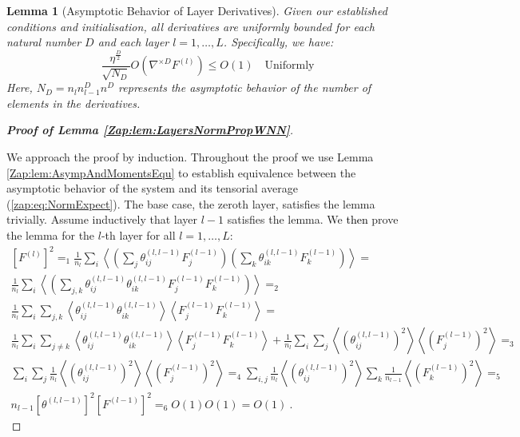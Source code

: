 \documentclass{article} %
\newtheorem{lemma}[theorem]{Lemma}
\begin{document}
\begin{lemma}[Asymptotic Behavior of Layer Derivatives]
\label{Zap:lem:LayersDerAsyBehvaior}
\textup
{Given our established conditions and initialisation, all derivatives are uniformly bounded for each natural number \(D\) and each layer \(l=1,\ldots,L\). Specifically, we have:
\begin{equation}
\frac{\eta^{\frac{D}{2}}}{\sqrt{N_{D}}}O\left(\nabla^{\times D}F^{(l)}\right)\leq O\left(1\right)\quad\text{Uniformly}
\label{zap:eq:Orech}
\end{equation}
Here, \(N_{D}=n_{l}n_{l-1}^{D}n^{D}\) represents the asymptotic behavior of the number of elements in the derivatives.
}
\end{lemma}


\begin{proof}[\textbf{Proof of Lemma \ref{Zap:lem:LayersNormPropWNN}}]
\

We approach the proof by induction. Throughout the proof we use Lemma \ref{Zap:lem:AsympAndMomentsEqu} to establish equivalence between the asymptotic behavior of the system and its tensorial average (\ref{zap:eq:NormExpect}).
The base case, the zeroth layer, satisfies the lemma trivially.
Assume inductively that layer \(l-1\) satisfies the lemma.
We \textcolor{black}{then} prove the lemma for the \(l\)-th layer for all \(l=1,\ldots,L\):
\begin{equation}
\begin{array}{c}
\left[F^{(l)}\right]^{2}=_{1}\frac{1}{n_{l}}\sum_{i}\left\langle \left(\sum_{j}\theta_{ij}^{\left(l,l-1\right)}F_{j}^{\left(l-1\right)}\right)\left(\sum_{k}\theta_{ik}^{\left(l,l-1\right)}F_{k}^{\left(l-1\right)}\right)\right\rangle =\\
\frac{1}{n_{l}}\sum_{i}\left\langle \left(\sum_{j,k}\theta_{ij}^{\left(l,l-1\right)}\theta_{ik}^{\left(l,l-1\right)}F_{j}^{\left(l-1\right)}F_{k}^{\left(l-1\right)}\right)\right\rangle =_{2}\\
\frac{1}{n_{l}}\sum_{i}\sum_{j,k}\left\langle \theta_{ij}^{\left(l,l-1\right)}\theta_{ik}^{\left(l,l-1\right)}\right\rangle \left\langle F_{j}^{\left(l-1\right)}F_{k}^{\left(l-1\right)}\right\rangle =\\
\frac{1}{n_{l}}\sum_{i}\sum_{j\neq k}\left\langle \theta_{ij}^{\left(l,l-1\right)}\theta_{ik}^{\left(l,l-1\right)}\right\rangle \left\langle F_{j}^{\left(l-1\right)}F_{k}^{\left(l-1\right)}\right\rangle +\frac{1}{n_{l}}\sum_{i}\sum_{j}\left\langle \left(\theta_{ij}^{\left(l,l-1\right)}\right)^{2}\right\rangle \left\langle \left(F_{j}^{\left(l-1\right)}\right)^{2}\right\rangle =_{3}\\
\sum_{i}\sum_{j}\frac{1}{n_{l}}\left\langle \left(\theta_{ij}^{\left(l,l-1\right)}\right)^{2}\right\rangle \left\langle \left(F_{j}^{\left(l-1\right)}\right)^{2}\right\rangle =_{4}\sum_{i,j}\frac{1}{n_{l}}\left\langle \left(\theta_{ij}^{\left(l,l-1\right)}\right)^{2}\right\rangle \sum_{k}\frac{1}{n_{l-1}}\left\langle \left(F_{k}^{\left(l-1\right)}\right)^{2}\right\rangle =_{5}\\
n_{l-1}\left[\theta^{\left(l,l-1\right)}\right]^{2}\left[F^{(l-1)}\right]^{2}=_{6}O\left(1\right)O\left(1\right)=O\left(1\right) \ .
\end{array}
\end{equation}


\end{proof}
\end{document}
